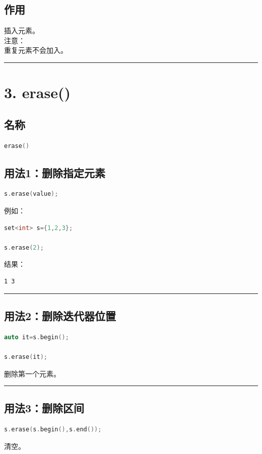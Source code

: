 \documentclass[9pt,twocolumn]{extarticle}
\begin{document}
\subsection{作用}
插入元素。\\
注意：\\
重复元素不会加入。

\noindent\rule{\linewidth}{0.4pt}

\section{3. erase()}

\subsection{名称}
\begin{lstlisting}[language=C++]
erase()
\end{lstlisting}

\subsection{用法1：删除指定元素}
\begin{lstlisting}[language=C++]
s.erase(value);
\end{lstlisting}
例如：
\begin{lstlisting}[language=C++]
set<int> s={1,2,3};

s.erase(2);
\end{lstlisting}
结果：
\begin{lstlisting}
1 3
\end{lstlisting}

\noindent\rule{\linewidth}{0.4pt}

\subsection{用法2：删除迭代器位置}
\begin{lstlisting}[language=C++]
auto it=s.begin();

s.erase(it);
\end{lstlisting}
删除第一个元素。

\noindent\rule{\linewidth}{0.4pt}

\subsection{用法3：删除区间}
\begin{lstlisting}[language=C++]
s.erase(s.begin(),s.end());
\end{lstlisting}
清空。
\end{document}
